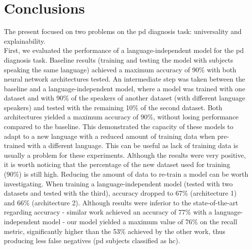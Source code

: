 
\chapter{Conclusions}
\label{ch:magna}


The present focused on two problems on the \gls{pd} diagnosis task: universality and explainability. \\
First, we evaluated the performance of a language-independent model for the \gls{pd} diagnosis task. Baseline results (training and testing the model with subjects speaking the same language) achieved a maximum accuracy of 90\% with both neural network architectures tested. An intermediate step was taken between the baseline and a language-independent model, where a model was trained with one dataset and with 90\% of the speakers of another dataset (with different language speakers) and tested with the remaining 10\% of the second dataset. Both architectures yielded a maximum accuracy of 90\%, without losing performance compared to the baseline. This demonstrated the capacity of these models to adapt to a new language with a reduced amount of training data when pre-trained with a different language. This can be useful as lack of training data is usually a problem for these experiments. Although the results were very positive, it is worth noticing that the percentage of the new dataset used for training (90\%) is still high. Reducing the amount of data to re-train a model can be worth investigating. When training a language-independent model (tested with two datasets and tested with the third), accuracy dropped to 67\% (architecture 1) and 66\% (architecture 2). Although results were inferior to the state-of-the-art regarding accuracy - similar work achieved an accuracy of 77\% with a language-independent model \cite{parkinson_three_languages} - our model yielded a maximum value of 76\% on the recall metric, significantly higher than the 53\% achieved by the other work, thus producing less false negatives (\gls{pd} subjects classified as \gls{hc}). \\
